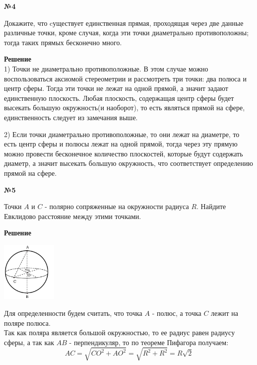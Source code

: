     \begin{center}
        \textbf{№4}
    \end{center}

    Докажите, что cуществует единственная прямая, проходящая через две данные различные точки,
    кроме случая, когда эти точки диаметрально противоположны;
    тогда таких прямых бесконечно много.

    \textbf{Решение}\\

    1) Точки не диаметрально противоположные.
    В этом случае можно воспользоваться аксиомой стереометрии и рассмотреть три точки: два полюса и центр сферы.
    Тогда эти точки не лежат на одной прямой, а значит задают единственную плоскость.
    Любая плоскость, содержащая центр сферы будет высекать большую окружность(и наоборот), то есть являться прямой на сфере,
    единственность следует из замечания выше.

    2) Если точки диаметрально противоположные, то они лежат на диаметре, то есть центр сферы и полюсы лежат на одной прямой,
    тогда через эту прямую можно провести бесконечное количество плоскостей, которые будут содержать диаметр, а значит
    высекать большую окружность, что соответствует определению прямой на сфере.

    \begin{center}
        \textbf{№5}
    \end{center}

    Точки $A$ и $C$ - полярно сопряженные на окружности радиуса $R$.
    Найдите Евклидово расстояние между этими точками.

    \textbf{Решение}\\

    \begin{center}
        \includegraphics[width=0.2\textwidth]{images/img2}\\
    \end{center}

    Для определенности будем считать, что точка $A$ - полюс, а точка $C$ лежит на поляре полюса.\\

    Так как поляра является большой окружностью, то ее радиус равен радиусу сферы, а так как $AB$ - перпендикуляр,
    то по теореме Пифагора получаем:
    \[
        AC = \sqrt {CO ^ 2 + AO ^ 2} = \sqrt {R ^ 2 + R ^ 2} = R\sqrt {2}
    \]

